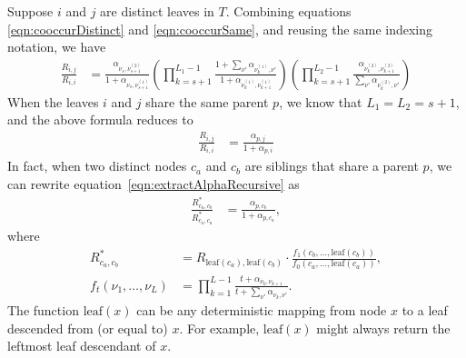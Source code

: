 \documentclass{article}
\theoremstyle{definition}
\newcommand{\leaf}{\text{leaf}}
\begin{document}
Suppose $i$ and $j$ are distinct leaves in $T$.
Combining equations \eqref{eqn:cooccurDistinct} and \eqref{eqn:cooccurSame}, and reusing the same indexing notation, we have
\begin{align}
\frac{R_{i,j}}{R_{i,i}}
&=
\frac
  { \alpha_{ \nu_s, \nu_{s+1}^{(2)} } }
  { 1 + \alpha_{ \nu_s, \nu_{s+1}^{(1)} } }
\left(
  \prod_{k=s+1}^{L_1-1}
    \frac
      { 1 + \sum_{\nu'} \alpha_{ \nu_k^{(1)}, \nu' } }
      { 1 + \alpha_{ \nu_k^{(1)}, \nu_{k+1}^{(1)} } }
\right)
\left(
  \prod_{k=s+1}^{L_2-1}
    \frac
      { \alpha_{ \nu_k^{(2)}, \nu_{k+1}^{(2)} } }
      { \sum_{\nu'} \alpha_{ \nu_k^{(2)}, \nu' } }
\right)
\label{eqn:extractAlphaRecursive}
\end{align}
When the leaves $i$ and $j$ share the same parent $p$, we know that $L_1 = L_2 = s+1$, and the above formula reduces to
\begin{align}
\frac{R_{i,j}}{R_{i,i}}
&=
\frac
  { \alpha_{ p, j } }
  { 1 + \alpha_{ p, i } }
\label{eqn:extractAlphaBaseCase}
\end{align}
In fact, when two distinct nodes $c_a$ and $c_b$ are siblings that share a parent $p$, we can rewrite equation~\eqref{eqn:extractAlphaRecursive} as
\begin{align}
\frac{R^*_{c_a,c_b}}{R^*_{c_a,c_a}}
&=
\frac
  { \alpha_{ p, c_b } }
  { 1 + \alpha_{ p, c_a } },
\label{eqn:extractAlphaSimple}
\end{align}
where
\begin{align*}
R^*_{c_a,c_b}
&= R_{\leaf(c_a),\leaf(c_b)} \cdot \frac{ f_1(c_b, \ldots, \leaf(c_b)) }{ f_0(c_a, \ldots, \leaf(c_a)) },
\\
f_t(\nu_{1}, \ldots, \nu_L)
&=
  \prod_{k=1}^{L-1}
    \frac
      { t + \alpha_{ \nu_k, \nu_{k+1} } }
      { t + \sum_{\nu'} \alpha_{ \nu_k, \nu' } }.
\end{align*}
The function $\leaf(x)$ can be any deterministic mapping from node $x$ to a leaf descended from (or equal to) $x$.
For example, $\leaf(x)$ might always return the leftmost leaf descendant of $x$.
\end{document}
